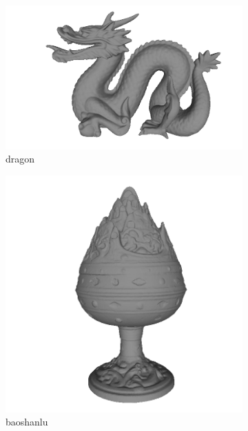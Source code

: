 \begin{figure}
\begin{subfigure}[b]{0.23\linewidth}
	\includegraphics[width=\linewidth]{./Figures/test-dataset/02.dragon.png}
	\caption{dragon}
\end{subfigure}
\begin{subfigure}[b]{0.23\linewidth}
	\includegraphics[width=\linewidth]{./Figures/test-dataset/03.baoshanlu.png}
	\caption{baoshanlu}
\end{subfigure}
\begin{subfigure}[b]{0.23\linewidth}

\end{subfigure}
\end{figure}
